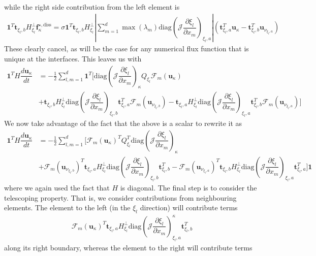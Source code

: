 \documentclass[12pt,a4paper]{article}
\newcommand{\pder}[2][]{\dfrac{\partial #1}{\partial #2}} %
\newcommand{\der}[2][]{\dfrac{d #1}{d #2}} %
\newcommand{\fn}[1]{\mathcal{#1}} %
\newcommand{\fnb}[1]{\bm{\mathcal{#1}}} %
\begin{document}
while the right side contribution from the left element is
\begin{align*}
\bm{1}^T \bm{t}_{\xi_l,b} H^{\bot}_{\xi_l} \bm{f}^{\star , \text{diss}}_{\kappa} = \sigma \bm{1}^T \bm{t}_{\xi_l,b} H^{\bot}_{\xi_l} \left\vert \sum_{m=1}^d \max (\lambda_m) \text{diag} \left( \fn{J} \pder[\xi_l]{x_m} \right)_{\xi_l,a} \right\vert \left( \bm{t}^T_{\xi_l,a} \bm{u}_\kappa - \bm{t}^T_{\xi_l,b} \bm{u}_{\nu_{\xi_l,a}}  \right)
\end{align*}
These clearly cancel, as will be the case for any numerical flux function that is unique at the interfaces. This leaves us with
\begin{align*}
\bm{1}^T H \der[\bm{u}_\kappa]{t} &= - \frac{1}{2} \sum_{l,m=1}^d  \bm{1}^T \Bigg[ \text{diag} \left( \fn{J} \pder[\xi_l]{x_m} \right)_\kappa Q_{\xi_l} \fnb{F}_m \left( \bm{u}_\kappa \right) \\
& + \bm{t}_{\xi_l,b} H^{\bot}_{\xi_l} \text{diag} \left( \fn{J} \pder[\xi_l]{x_m} \right)_{\xi_l,b} \bm{t}^T_{\xi_l,a}  \fnb{F}_m ( \bm{u}_{\nu_{\xi_l,b}} ) - \bm{t}_{\xi_l,a} H^{\bot}_{\xi_l} \text{diag} \left( \fn{J} \pder[\xi_l]{x_m} \right)_{\xi_l,a} \bm{t}_{\xi_l,b}^T  \fnb{F}_m ( \bm{u}_{\nu_{\xi_l,a}} ) \Bigg]
\end{align*} 
We now take advantage of the fact that the above is a scalar to rewrite it as
\begin{align*}
\bm{1}^T H \der[\bm{u}_\kappa]{t} &= - \frac{1}{2} \sum_{l,m=1}^d \Bigg[ \fnb{F}_m \left( \bm{u}_\kappa \right) ^T Q_{\xi_l}^T \text{diag} \left( \fn{J} \pder[\xi_l]{x_m} \right)_\kappa  \\
& +  \fnb{F}_m ( \bm{u}_{\nu_{\xi_l,b}} )^T \bm{t}_{\xi_l,a}  H^{\bot}_{\xi_l} \text{diag} \left( \fn{J} \pder[\xi_l]{x_m} \right)_{\xi_l,b} \bm{t}_{\xi_l,b}^T
-  \fnb{F}_m ( \bm{u}_{\nu_{\xi_l,a}} )^T \bm{t}_{\xi_l,b} H^{\bot}_{\xi_l} \text{diag} \left( \fn{J} \pder[\xi_l]{x_m} \right)_{\xi_l,a}  \bm{t}_{\xi_l,a}^T   
   \Bigg] \bm{1}
\end{align*}
where we again used the fact that $H$ is diagonal. The final step is to consider the telescoping property. That is, we consider contributions from neighbouring elements. The element to the left (in the $\xi_l$ direction) will contribute terms 
\begin{align*}
 \fnb{F}_m ( \bm{u}_{\kappa} )^T \bm{t}_{\xi_l,a}  H^{\bot}_{\xi_l} \text{diag} \left( \fn{J} \pder[\xi_l]{x_m} \right)_{\xi_l,a}^\kappa \bm{t}_{\xi_l,b}^T
\end{align*}
along its right boundary, whereas the element to the right will contribute terms
\end{document}
